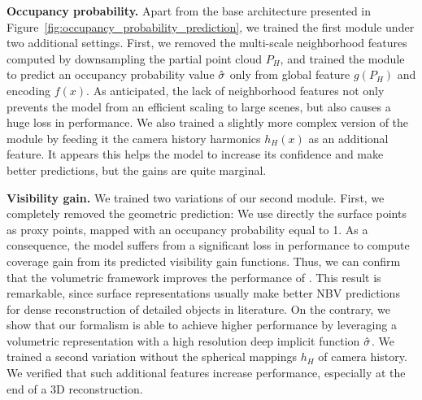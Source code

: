 \textbf{Occupancy probability.}  Apart from the base architecture presented in Figure~\ref{fig:occupancy_probability_prediction}, we trained the first module under two additional settings. First, we removed the multi-scale neighborhood features computed by downsampling the partial point cloud $P_H$, and trained the module to predict an occupancy probability value $\hat{\sigma}$ only from global feature $g(P_H)$ and encoding $f(x)$. As anticipated, the lack of neighborhood features not only prevents the model from an efficient scaling to large scenes, but also  causes a huge loss in performance. We also trained a slightly more complex version of the module by feeding it the camera history harmonics $h_H(x)$ as an additional feature. It appears this helps the model to increase its confidence and make better predictions, but the gains are quite marginal.

\textbf{Visibility gain.}  We trained two variations of our second module. First, we completely removed the geometric prediction: We use directly the surface points as proxy points, mapped with an occupancy probability equal to 1. As a consequence, the model suffers from a significant loss in performance to compute coverage gain from its predicted visibility gain functions. Thus, we can confirm that the volumetric framework improves the performance of \method. This result is remarkable, since surface representations usually make better NBV predictions for dense reconstruction of detailed objects in literature. On the contrary, we show that our formalism is able to achieve higher performance by leveraging a volumetric representation with a high resolution deep implicit function $\hat{\sigma}$. We trained a second variation without the spherical mappings $h_H$ of camera history. We verified that such additional features increase performance, especially at the end of a 3D reconstruction.